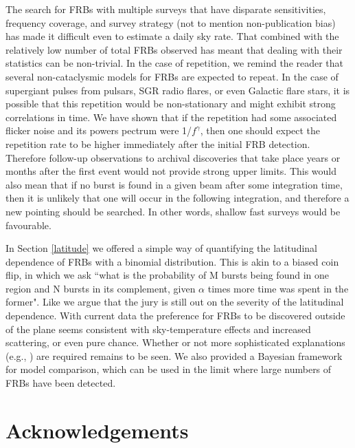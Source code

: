 \documentclass[useAMS,usenatbib]{mn2e}
\begin{document}
The search for FRBs with multiple surveys that have disparate sensitivities, 
frequency coverage, and survey strategy (not to mention non-publication bias) 
has made it difficult even to 
estimate a daily sky rate. 
That combined with the relatively low number of total FRBs observed 
has meant that dealing with their statistics can be non-trivial. In 
the case of repetition, we remind the reader that several non-cataclysmic 
models for FRBs are expected to repeat. In the case of supergiant 
pulses from pulsars, SGR radio flares, or even Galactic flare stars, it is possible 
that this repetition would be non-stationary and might exhibit strong correlations 
in time. We have shown that if the repetition had some associated flicker noise 
and its powers pectrum were 1/$f^\gamma$, then one should expect the repetition 
rate to be higher immediately after the initial FRB detection. Therefore follow-up 
observations to archival discoveries that take place years or 
months after the first event would not provide strong upper limits. 
This would also mean that if no burst is found in a given beam after some 
integration time, then it is unlikely that one will occur in the following integration, and therefore 
a new pointing should be searched. In other words, shallow fast surveys would be favourable. 

In Section \ref{latitude} we offered a simple way of quantifying the 
latitudinal dependence of FRBs with a binomial distribution. This 
is akin to a biased coin flip, in which we ask ``what is the probability of 
M bursts being found in one region and N bursts in its complement, given 
$\alpha$ times more time was spent in the former". Like \cite{2015arXiv150500834R} we argue
that the jury is still out on the severity of the latitudinal 
dependence. With current data the preference for FRBs to 
be discovered outside of the plane seems consistent with
sky-temperature effects and increased scattering, or even pure chance. 
Whether or not more sophisticated explanations 
(e.g., \citealt{2015MNRAS.451.3278M}) are required remains to be seen. 
We also provided a Bayesian framework for model comparison,
which can be used in the limit where large numbers of FRBs have
been detected. 

\section{Acknowledgements}
\end{document}

